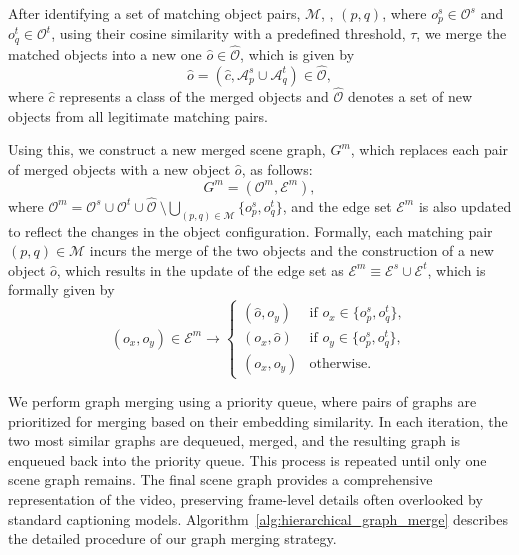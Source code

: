 After identifying a set of matching object pairs, $\mathcal{M}$, \eg, $(p, q)$, where $o_p^s \in \mathcal{O}^s$ and $o_q^t \in \mathcal{O}^t$, using their cosine similarity with a predefined threshold, $\tau$, we merge the matched objects into a new one $\hat{o} \in \hat{\mathcal{O}}$, which is given by
%
\begin{equation}
    \hat{o} = (\hat{c} , \mathcal{A}^s_p \cup \mathcal{A}^t_q) \in \hat{\mathcal{O}},
\end{equation}
%
where $\hat{c}$ represents a class of the merged objects and $\hat{\mathcal{O}}$ denotes a set of new objects from all legitimate matching pairs.

Using this, we construct a new merged scene graph, $G^m$, which replaces each pair of merged objects with a new object $\hat{o}$, as follows:
%
\begin{equation}
	G^m = (\mathcal{O}^m, \mathcal{E}^m),
\end{equation}
%
where $\mathcal{O}^{m} =\mathcal{O}^s \cup \mathcal{O}^t \cup \hat{\mathcal{O}} ~ \setminus \bigcup_{(p, q) \in \mathcal{M}} \{o^s_p, o^t_q\}$, and the edge set $\mathcal{E}^m$ is also updated to reflect the changes in the object configuration.
Formally, each matching pair $(p, q) \in \mathcal{M}$ incurs the merge of the two objects and the construction of a new object $\hat{o}$, which results in the update of the edge set as $\mathcal{E}^m \equiv \mathcal{E}^s \cup \mathcal{E}^t$, which is formally given by
%
\begin{equation}
	(o_x, o_y) \in \mathcal{E}^m \rightarrow 
	\begin{cases}
		(\hat{o}, o_y) & \text{if } o_x \in \{o_p^s, o_q^t \}, \\
		(o_x, \hat{o}) & \text{if } o_y \in \{o_p^s, o_q^t \}, \\
		(o_x, o_y) & \text{otherwise.}
	\end{cases}
\end{equation}

We perform graph merging using a priority queue, where pairs of graphs are prioritized for merging based on their embedding similarity. 
In each iteration, the two most similar graphs are dequeued, merged, and the resulting graph is enqueued back into the priority queue.
This process is repeated until only one scene graph remains.
The final scene graph provides a comprehensive representation of the video, preserving frame-level details often overlooked by standard captioning models.
Algorithm~\ref{alg:hierarchical_graph_merge} describes the detailed procedure of our graph merging strategy.
  
